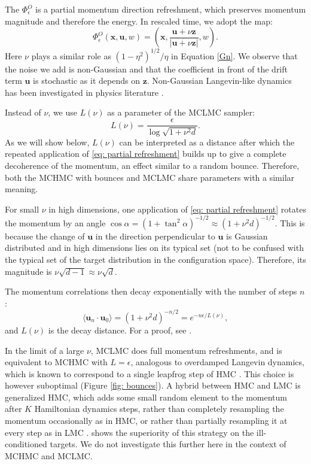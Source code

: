 \documentclass[twoside,11pt]{article}
\newcommand{\x}{\boldsymbol{x}}
\newcommand{\U}{\boldsymbol{u}}
\begin{document}
The $\Phi^O_{\epsilon}$ is a partial momentum direction refreshment, which preserves momentum magnitude and therefore the energy. In rescaled time, we adopt the map:
\begin{equation} \label{eq: partial refreshment}
    \Phi^O_{\epsilon}(\x, \U, w) = (\x, \frac{\boldsymbol{u} + \nu \boldsymbol{z}}{ \vert \boldsymbol{u} + \nu \boldsymbol{z} \vert}, w).
\end{equation}
Here $\nu$ plays a similar role as $(1 - \eta^2)^{1/2}/\eta$ in Equation \ref{Gn}. 
We observe that the noise we add
is non-Gaussian and that the coefficient in front of the 
drift term $\boldsymbol{u}$ is 
stochastic as it depends on $\boldsymbol{z}$. Non-Gaussian Langevin-like 
dynamics has been investigated in physics 
literature \citep{PhysRevLett.114.090601}. 

Instead of $\nu$, we use $L(\nu)$ as a parameter of the MCLMC sampler:
\begin{equation}
   L(\nu) =  \frac{\epsilon}{\log{\sqrt{1+\nu^2 d} }} .
\end{equation}
As we will show below, $L(\nu)$ can be interpreted as a distance after which the repeated application of \eqref{eq: partial refreshment} builds up to give a complete decoherence of the momentum, an effect similar to a random bounce. Therefore, both the MCHMC with bounces and MCLMC share parameters with a similar meaning. 


For small $\nu$ in high dimensions, one application of \eqref{eq: partial refreshment} rotates the momentum by an angle $\cos \alpha = (1 + \tan^2 \alpha)^{-1/2} \approx (1 + \nu^2 d)^{-1/2}$. This is because the change of $\textbf{u}$ in the direction perpendicular to $\textbf{u}$ is Gaussian distributed and in high dimensions lies on its typical set (not to be confused with the typical set of the target distribution in the configuration space). Therefore, its magnitude is $\nu \sqrt{d -1} \approx \nu \sqrt{d}$. 

The momentum correlations then decay exponentially with the number of steps $n$:
\begin{equation} \label{eq: correlations}
    \langle \boldsymbol{u}_n \cdot \boldsymbol{u}_0 \rangle = (1 + \nu^2 d)^{-n / 2} = e^{- n \epsilon / L(\nu)},
\end{equation}
and $L(\nu)$ is the decay distance. For a proof, see \citet{SphereRandomWalk}.

In the limit of a large $\nu$, MCLMC does 
full momentum refreshments, and is equivalent to MCHMC 
with $L = \epsilon$, analogous to overdamped 
Langevin dynamics, which is known 
to correspond to a single leapfrog step 
of HMC \citep{riemannHMC}. This choice 
is however suboptimal (Figure \ref{fig: bounces}).
A hybrid between HMC and LMC is 
generalized HMC, which adds some small random element to the momentum after $K$ 
Hamiltonian dynamics steps, rather than completely resampling the momentum occasionally as in HMC, or rather than 
partially resampling it at every step as in LMC \citep{generalizedHMC, tuninggeneralizedHMC}. \citet{generalizedHMCproof} shows the superiority of this strategy on the ill-conditioned targets. We do not 
investigate this further here in the 
context of MCHMC and MCLMC. 
\end{document}

